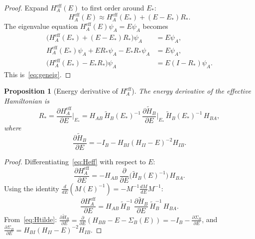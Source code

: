 \documentclass[12pt]{article}
\theoremstyle{plain}
\newtheorem{proposition}[theorem]{Proposition}
\theoremstyle{definition}
\numberwithin{equation}{section}
\newcommand{\eff}{\mathrm{eff}}
\begin{document}
\begin{proof}
Expand $H_A^{\eff}(E)$ to first order around $E_*$:
\begin{equation}
H_A^{\eff}(E) \approx H_A^{\eff}(E_*) + (E-E_*)R_*.
\end{equation}
The eigenvalue equation $H_A^{\eff}(E)\psi_A=E\psi_A$ becomes
\begin{align}
\bigl(H_A^{\eff}(E_*)+(E-E_*)R_*\bigr)\psi_A &= E\psi_A,\\
H_A^{\eff}(E_*)\psi_A + ER_*\psi_A - E_*R_*\psi_A &= E\psi_A,\\
\bigl(H_A^{\eff}(E_*)-E_*R_*\bigr)\psi_A &= E(I-R_*)\psi_A.
\end{align}
This is~\eqref{eq:geneig}.
\end{proof}

\begin{proposition}[Energy derivative of $H_A^{\eff}$]\label{prop:Rstar}
The energy derivative of the effective Hamiltonian is
\begin{equation}\label{eq:Rstar}
R_* = \frac{\partial H_A^{\eff}}{\partial E}\bigg|_{E_*}
= H_{AB}\,\widetilde{H}_B(E_*)^{-1}\,
\frac{\partial\widetilde{H}_B}{\partial E}\bigg|_{E_*}\,
\widetilde{H}_B(E_*)^{-1}\,H_{BA},
\end{equation}
where
\begin{equation}
\frac{\partial\widetilde{H}_B}{\partial E}
= -I_B - H_{BI}(H_{II}-E)^{-2}H_{IB}.
\end{equation}
\end{proposition}

\begin{proof}
Differentiating~\eqref{eq:Heff} with respect to $E$:
\begin{equation}
\frac{\partial H_A^{\eff}}{\partial E}
= -H_{AB}\,\frac{\partial}{\partial E}
\bigl(\widetilde{H}_B(E)^{-1}\bigr)\,H_{BA}.
\end{equation}
Using the identity
$\frac{d}{dE}(M(E)^{-1})=-M^{-1}\frac{dM}{dE}M^{-1}$:
\begin{equation}
\frac{\partial H_A^{\eff}}{\partial E}
= H_{AB}\,\widetilde{H}_B^{-1}\,
\frac{\partial\widetilde{H}_B}{\partial E}\,
\widetilde{H}_B^{-1}\,H_{BA}.
\end{equation}
From~\eqref{eq:Htilde}:
$\frac{\partial\widetilde{H}_B}{\partial E}
=\frac{\partial}{\partial E}(H_{BB}-E-\Sigma_B(E))
=-I_B-\frac{\partial\Sigma_B}{\partial E}$,
and $\frac{\partial\Sigma_B}{\partial E}
=H_{BI}(H_{II}-E)^{-2}H_{IB}$.
\end{proof}
\end{document}
